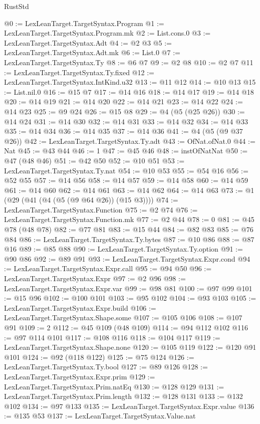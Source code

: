 \begin{lexlean}{RustStd}
\begin{coremodule}
@0 := LexLeanTarget.TargetSyntax.Program
@1 := LexLeanTarget.TargetSyntax.Program.mk
@2 := List.cons.{0}
@3 := LexLeanTarget.TargetSyntax.Adt
@4 := @2 @3
@5 := LexLeanTarget.TargetSyntax.Adt.mk
@6 := List.{0}
@7 := LexLeanTarget.TargetSyntax.Ty
@8 := @6 @7
@9 := @2 @8
@10 := @2 @7
@11 := LexLeanTarget.TargetSyntax.Ty.fixed
@12 := LexLeanTarget.TargetSyntax.IntKind.u32
@13 := @11 @12
@14 := @10 @13
@15 := List.nil.{0}
@16 := @15 @7
@17 := @14 @16
@18 := @14 @17
@19 := @14 @18
@20 := @14 @19
@21 := @14 @20
@22 := @14 @21
@23 := @14 @22
@24 := @14 @23
@25 := @9 @24
@26 := @15 @8
@29 := @4 (@5 (@25 @26))
@30 := @14 @24
@31 := @14 @30
@32 := @14 @31
@33 := @14 @32
@34 := @14 @33
@35 := @14 @34
@36 := @14 @35
@37 := @14 @36
@41 := @4 (@5 (@9 @37 @26))
@42 := LexLeanTarget.TargetSyntax.Ty.adt
@43 := OfNat.ofNat.{0}
@44 := Nat
@45 := @43 @44
@46 := 1
@47 := @45 @46
@48 := instOfNatNat
@50 := @47 (@48 @46)
@51 := @42 @50
@52 := @10 @51
@53 := LexLeanTarget.TargetSyntax.Ty.nat
@54 := @10 @53
@55 := @54 @16
@56 := @52 @55
@57 := @14 @56
@58 := @14 @57
@59 := @14 @58
@60 := @14 @59
@61 := @14 @60
@62 := @14 @61
@63 := @14 @62
@64 := @14 @63
@73 := @1 (@29 (@41 (@4 (@5 (@9 @64 @26)) (@15 @3))))
@74 := LexLeanTarget.TargetSyntax.Function
@75 := @2 @74
@76 := LexLeanTarget.TargetSyntax.Function.mk
@77 := @2 @44
@78 := 0
@81 := @45 @78 (@48 @78)
@82 := @77 @81
@83 := @15 @44
@84 := @82 @83
@85 := @76 @84
@86 := LexLeanTarget.TargetSyntax.Ty.bytes
@87 := @10 @86
@88 := @87 @16
@89 := @85 @88
@90 := LexLeanTarget.TargetSyntax.Ty.option
@91 := @90 @86
@92 := @89 @91
@93 := LexLeanTarget.TargetSyntax.Expr.cond
@94 := LexLeanTarget.TargetSyntax.Expr.call
@95 := @94 @50
@96 := LexLeanTarget.TargetSyntax.Expr
@97 := @2 @96
@98 := LexLeanTarget.TargetSyntax.Expr.var
@99 := @98 @81
@100 := @97 @99
@101 := @15 @96
@102 := @100 @101
@103 := @95 @102
@104 := @93 @103
@105 := LexLeanTarget.TargetSyntax.Expr.build
@106 := LexLeanTarget.TargetSyntax.Shape.some
@107 := @105 @106
@108 := @107 @91
@109 := 2
@112 := @45 @109 (@48 @109)
@114 := @94 @112 @102
@116 := @97 @114 @101
@117 := @108 @116
@118 := @104 @117
@119 := LexLeanTarget.TargetSyntax.Shape.none
@120 := @105 @119
@122 := @120 @91 @101
@124 := @92 (@118 @122)
@125 := @75 @124
@126 := LexLeanTarget.TargetSyntax.Ty.bool
@127 := @89 @126
@128 := LexLeanTarget.TargetSyntax.Expr.prim
@129 := LexLeanTarget.TargetSyntax.Prim.natEq
@130 := @128 @129
@131 := LexLeanTarget.TargetSyntax.Prim.length
@132 := @128 @131
@133 := @132 @102
@134 := @97 @133
@135 := LexLeanTarget.TargetSyntax.Expr.value
@136 := @135 @53
@137 := LexLeanTarget.TargetSyntax.Value.nat

\end{coremodule}
\end{lexlean}
